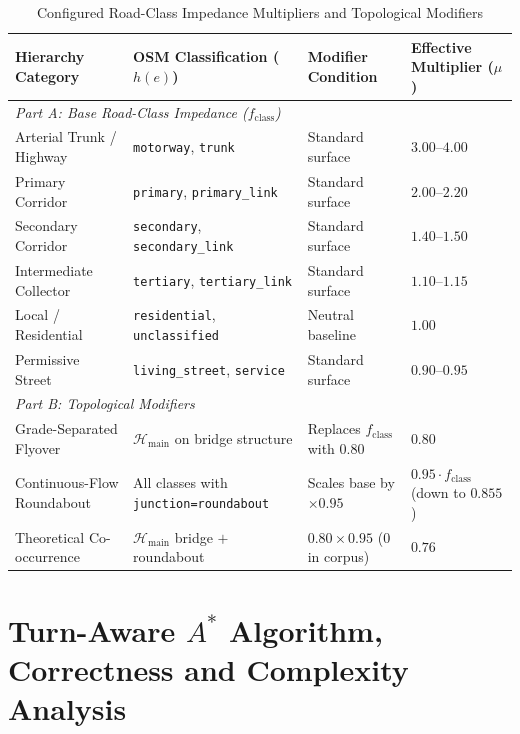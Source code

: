 \documentclass[conference]{IEEEtran}
\begin{document}
\begin{table}[t]
\caption{Configured Road-Class Impedance Multipliers and Topological Modifiers}
\label{tab:road_impedance}
\centering
\footnotesize
\begin{tabular*}{\textwidth}{@{\extracolsep{\fill}}llll@{}}
\hline
\textbf{Hierarchy Category} & \textbf{OSM Classification ($h(e)$)} & \textbf{Modifier Condition} & \textbf{Effective Multiplier ($\mu$)} \\
\hline
\multicolumn{4}{l}{\textit{Part A: Base Road-Class Impedance ($f_{\mathrm{class}}$)}} \\
Arterial Trunk / Highway & \texttt{motorway}, \texttt{trunk} & Standard surface & $3.00\text{--}4.00$ \\
Primary Corridor & \texttt{primary}, \texttt{primary\_link} & Standard surface & $2.00\text{--}2.20$ \\
Secondary Corridor & \texttt{secondary}, \texttt{secondary\_link} & Standard surface & $1.40\text{--}1.50$ \\
Intermediate Collector & \texttt{tertiary}, \texttt{tertiary\_link} & Standard surface & $1.10\text{--}1.15$ \\
Local / Residential & \texttt{residential}, \texttt{unclassified} & Neutral baseline & $1.00$ \\
Permissive Street & \texttt{living\_street}, \texttt{service} & Standard surface & $0.90\text{--}0.95$ \\
\hline
\multicolumn{4}{l}{\textit{Part B: Topological Modifiers}} \\
Grade-Separated Flyover & $\mathcal{H}_{\mathrm{main}}$ on bridge structure & Replaces $f_{\mathrm{class}}$ with $0.80$ & $0.80$ \\
Continuous-Flow Roundabout & All classes with \texttt{junction=roundabout} & Scales base by $\times 0.95$ & $0.95 \cdot f_{\mathrm{class}}$ (down to $0.855$) \\
Theoretical Co-occurrence & $\mathcal{H}_{\mathrm{main}}$ bridge $+$ roundabout & $0.80 \times 0.95$ ($0$ in corpus) & $0.76$ \\
\hline
\end{tabular*}
\end{table}

\section{Turn-Aware $A^*$ Algorithm, Correctness and Complexity Analysis}
\end{document}
